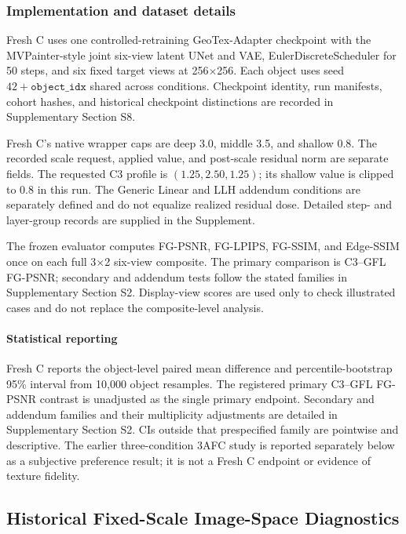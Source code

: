 \documentclass[times,twocolumn,final]{elsarticle}
\begin{document}
\subsubsection{Implementation and dataset details}

Fresh C uses one controlled-retraining GeoTex-Adapter checkpoint with the MVPainter-style joint six-view latent UNet and VAE, EulerDiscreteScheduler for 50 steps, and six fixed target views at 256$\times$256. Each object uses seed $42+\texttt{object\_idx}$ shared across conditions. Checkpoint identity, run manifests, cohort hashes, and historical checkpoint distinctions are recorded in Supplementary Section S8.

Fresh C's native wrapper caps are deep 3.0, middle 3.5, and shallow 0.8. The recorded scale request, applied value, and post-scale residual norm are separate fields. The requested C3 profile is $(1.25,2.50,1.25)$; its shallow value is clipped to 0.8 in this run. The Generic Linear and LLH addendum conditions are separately defined and do not equalize realized residual dose. Detailed step- and layer-group records are supplied in the Supplement.

The frozen evaluator computes FG-PSNR, FG-LPIPS, FG-SSIM, and Edge-SSIM once on each full 3$\times$2 six-view composite. The primary comparison is C3--GFL FG-PSNR; secondary and addendum tests follow the stated families in Supplementary Section S2. Display-view scores are used only to check illustrated cases and do not replace the composite-level analysis.

\paragraph{Statistical reporting}
Fresh C reports the object-level paired mean difference and percentile-bootstrap 95\% interval from 10{,}000 object resamples. The registered primary C3--GFL FG-PSNR contrast is unadjusted as the single primary endpoint. Secondary and addendum families and their multiplicity adjustments are detailed in Supplementary Section S2. CIs outside that prespecified family are pointwise and descriptive. The earlier three-condition 3AFC study is reported separately below as a subjective preference result; it is not a Fresh C endpoint or evidence of texture fidelity.

\subsection{Historical Fixed-Scale Image-Space Diagnostics}
\label{subsec:tradeoff}
\end{document}
